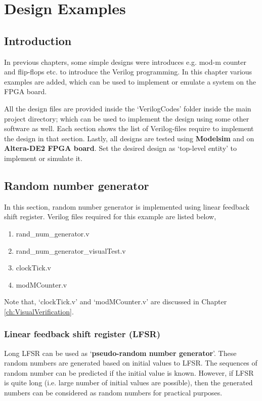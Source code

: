 \chapter{Design Examples} \label{ch:DesignExamples}

\graphicspath{{Chapters/DesignExamples/Figures/}}


\section{Introduction}
In previous chapters, some simple designs were introduces e.g. mod-m counter and flip-flops etc. to introduce the Verilog programming. In this chapter various examples are added, which can be used to implement or emulate a system on the FPGA board. 

All the design files are provided inside the `VerilogCodes' folder inside the main project directory; which can be used to implement the design using some other software as well. Each section shows the list of Verilog-files require to implement the design in that section. Lastly, all designs are tested using \textbf{Modelsim} and on \textbf{Altera-DE2 FPGA board}. Set the desired design as `top-level entity' to implement or simulate it. 

\section{Random number generator}
In this section, random number generator is implemented using linear feedback shift register. Verilog files required for this example are listed below, 
\begin{enumerate}
	\item rand\_num\_generator.v
	\item rand\_num\_generator\_visualTest.v
	\item clockTick.v
	\item modMCounter.v
\end{enumerate}
Note that, `clockTick.v' and `modMCounter.v' are discussed in Chapter \ref{ch:VisualVerification}.

\subsection{Linear feedback shift register (LFSR)}
Long LFSR can be used as `\textbf{pseudo-random number generator}'.  These random numbers are generated based on initial values to LFSR. The sequences of random number can be predicted if the initial value is known. However, if LFSR is quite long (i.e. large number of initial values are possible), then the generated numbers can be considered as random numbers for practical purposes.  

